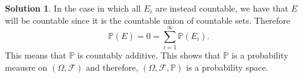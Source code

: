 \documentclass[12pt]{article}
\newcommand{\Prob}{\mathbb{P}}
\newcommand{\calF}{\mathcal{F}}
\theoremstyle{definition}
\newtheorem{sol}{Solution}
\theoremstyle{remark}
\begin{document}
\begin{sol}
In the case in which all $E_i$ are instead countable, we have that $E$ will be countable since it is the countable union of countable sets. Therefore 
\begin{equation}
    \Prob(E) = 0 = \sum_{i = 1}^\infty \Prob(E_i).
\end{equation}
This means that $\Prob$ is countably additive. This shows that $\Prob$ is a probability meausre on $(\Omega, \calF)$ and therefore, $(\Omega,\calF, \Prob)$ is a probability space.
\end{sol}
\end{document}
